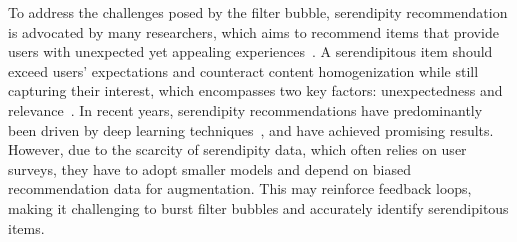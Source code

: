 To address the challenges posed by the filter bubble, serendipity recommendation is advocated by many researchers, which aims to recommend items that provide users with unexpected yet appealing experiences~\cite{fu2023deep,ziarani2021serendipity,kotkov2016survey}. A serendipitous item should exceed users' expectations and counteract content homogenization while still capturing their interest,  which encompasses two key factors:  unexpectedness and relevance~\cite{fu2023deep,kotkov2024overview}. In recent years, serendipity recommendations have predominantly been driven by deep learning techniques~\cite{fu2023deep,fu2023wisdom,li2020directional,li2020purs,zhang2021snpr,wang2023industrial,cheng2017learning,liu2023personalized}, and have achieved promising results. However, due to the scarcity of serendipity data, which often relies on user surveys, they have to adopt smaller models and depend on biased recommendation data for augmentation. This may reinforce feedback loops, making it challenging to burst filter bubbles and accurately identify serendipitous items.



